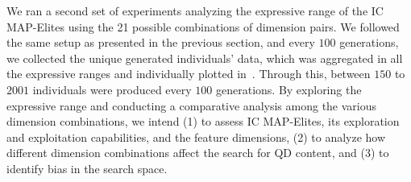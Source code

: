 % 





We ran a second set of experiments analyzing the expressive range  of the IC MAP-Elites using the 21 possible combinations of dimension pairs. We followed the same setup as presented in the previous section, and every $100$ generations, we collected the unique generated individuals' data, which was aggregated in all the expressive ranges and individually plotted in~. Through this, between $150$ to $2001$ individuals were produced every $100$ generations. By exploring the expressive range and conducting a comparative analysis among the various dimension combinations, we intend (1) to assess IC MAP-Elites, its exploration and exploitation capabilities, and the feature dimensions, (2) to analyze how different dimension combinations affect the search for QD content, and (3) to identify bias in the search space.

